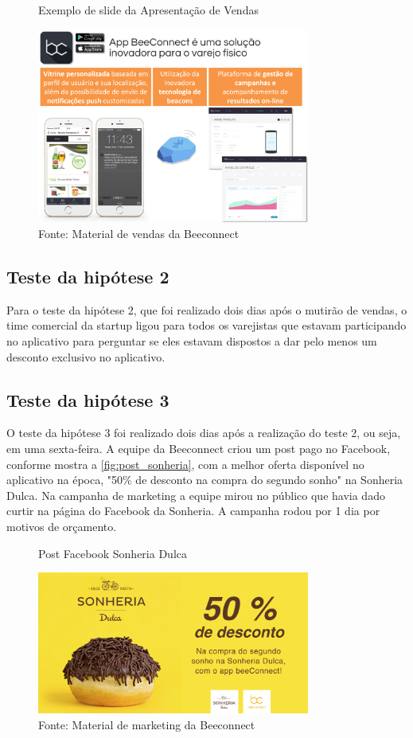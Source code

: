 \begin{figure}[H]
\caption{Exemplo de slide da Apresentação de Vendas}
\centerline{\includegraphics[width=0.8\textwidth]{img/apresentacao_vendas_bc}}
\label{fig:apresentacao_vendas_bc}
\caption* {Fonte: Material de vendas da Beeconnect}
\end{figure}

\subsection{Teste da hipótese 2}
\label{cha:teste_2}
Para o teste da hipótese 2, que foi realizado dois dias após o mutirão de vendas, o time comercial da startup ligou para todos os varejistas que estavam participando no aplicativo para perguntar se eles estavam dispostos a dar pelo menos um desconto exclusivo no aplicativo.

\subsection{Teste da hipótese 3}
\label{cha:teste_3}
O teste da hipótese 3 foi realizado dois dias após a realização do teste 2, ou seja, em uma sexta-feira. A equipe da Beeconnect criou um post pago no Facebook, conforme mostra a \autoref{fig:post_sonheria}, com a melhor oferta disponível no aplicativo na época, "50\% de desconto na compra do segundo sonho" na Sonheria Dulca. Na campanha de marketing a equipe mirou no público que havia dado curtir na página do Facebook da Sonheria. A campanha rodou por 1 dia por motivos de orçamento.

\begin{figure}[H]
\caption{Post Facebook Sonheria Dulca}
\centerline{\includegraphics[width=0.8\textwidth]{img/post_sonheria}}
\label{fig:post_sonheria}
\caption* {Fonte: Material de marketing da Beeconnect}
\end{figure}

